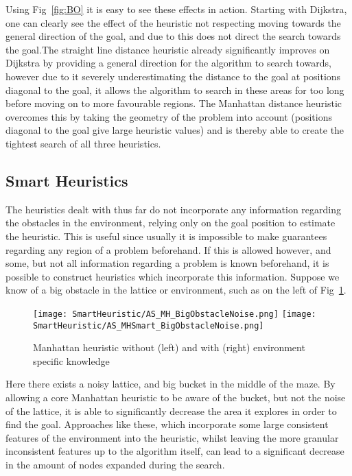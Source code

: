\documentclass[conference]{IEEEtran}
\begin{document}
\par Using Fig~\ref{fig:BO} it is easy to see these effects in action. Starting with Dijkstra, one can clearly see the effect of the heuristic not respecting moving towards the general direction of the goal, and due to this does not direct the search towards the goal.The straight line distance heuristic already significantly improves on Dijkstra by providing a general direction for the algorithm to search towards, however due to it severely underestimating the distance to the goal at positions diagonal to the goal, it allows the algorithm to search in these areas for too long before moving on to more favourable regions. The Manhattan distance heuristic overcomes this by taking the geometry of the problem into account (positions diagonal to the goal give large heuristic values) and is thereby able to create the tightest search of all three heuristics.

\subsection{Smart Heuristics}
\label{SmartHeuristics}


The heuristics dealt with thus far do not incorporate any information regarding the obstacles in the environment, relying only on the goal position to estimate the heuristic. This is useful since usually it is impossible to make guarantees regarding any region of a problem beforehand. If this is allowed however, and some, but not all information regarding a problem is known beforehand, it is possible to construct heuristics which incorporate this information. Suppose we know of a big obstacle in the lattice or environment, such as on the left of Fig~\ref{fig:SmartH}.

\begin{figure}[H]
    \centering
     \texttt{[image: SmartHeuristic/AS\_MH\_BigObstacleNoise.png]}
     \texttt{[image: SmartHeuristic/AS\_MHSmart\_BigObstacleNoise.png]}
    \caption{Manhattan heuristic without (left) and with (right) environment specific knowledge}    
    \label{fig:SmartH}
\end{figure}

\par Here there exists a noisy lattice, and big bucket in the middle of the maze. By allowing a core Manhattan heuristic to be aware of the bucket, but not the noise of the lattice, it is able to significantly decrease the area it explores in order to find the goal. Approaches like these, which incorporate some large consistent features of the environment into the heuristic, whilst leaving the more granular inconsistent features up to the algorithm itself, can lead to a significant decrease in the amount of nodes expanded during the search.
\end{document}

